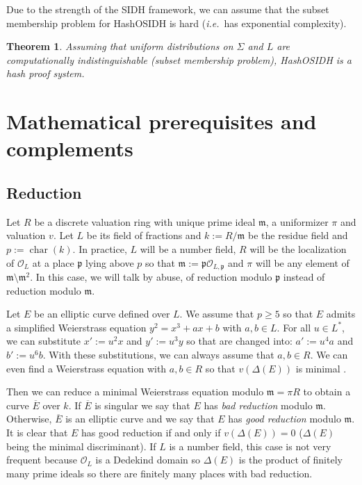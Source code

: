 \documentclass[a4paper,10pt]{report}
\theoremstyle{definition}
\theoremstyle{plain}
\newtheorem{theorem}[definition]{Theorem}
\theoremstyle{definition}
\newcommand{\ie}{\emph{i.e.}\ }
\newcommand{\mO}{\mathcal{O}}
\renewcommand{\(}{\left(}
\renewcommand{\)}{\right)}
\newcommand{\mf}[1]{\mathfrak{#1}}
\newcommand{\mfm}{\mathfrak{m}}
\newcommand{\mfp}{\mathfrak{p}}
\DeclareMathOperator{\Char}{char}%
\begin{document}
Due to the strength of the SIDH framework, we can assume that the subset membership problem for HashOSIDH is hard (\ie has exponential complexity).

\begin{theorem}
Assuming that uniform distributions on $\Sigma$ and $L$ are computationally indistinguishable (subset membership problem), HashOSIDH is a hash proof system.
\end{theorem}




\appendix

\chapter{Mathematical prerequisites and complements}

\section{Reduction}

Let $R$ be a discrete valuation ring with unique prime ideal $\mf{m}$,  a uniformizer $\pi$ and valuation $v$.  Let $L$ be its field of fractions and $k:=R/\mfm$ be the residue field and $p:=\Char(k)$.  In practice,  $L$ will be a number field, $R$ will be the localization of $\mO_L$ at a place $\mfp$ lying above $p$ so that $\mfm:=\mfp\mO_{L,\mfp}$ and $\pi$ will be any element of $\mfm\setminus\mfm^2$.  In this case, we will talk by abuse, of reduction modulo $\mfp$ instead of reduction modulo $\mfm$. 

Let $E$ be an elliptic curve defined over $L$.  We assume that $p\geq 5$ so that $E$ admits a simplified Weierstrass equation $y^2=x^3+ax+b$ with $a,b\in L$.  For all $u\in L^*$,  we can substitute $x':=u^2 x$ and $y':=u^3 y$ so that are changed into: $a':=u^4a$ and  $b':=u^6b$.  With these substitutions,  we can always assume that $a, b\in R$.  We can even find a Weierstrass equation with $a, b\in R$ so that $v(\Delta(E))$ is minimal \cite[proposition VII.1.3.(a)]{Silverman1}.  

Then we can reduce a minimal Weierstrass equation modulo $\mfm=\pi R$ to obtain a curve $\overline{E}$ over $k$.  If $\overline{E}$ is singular we say that $E$ has \emph{bad reduction} modulo $\mfm$.  Otherwise,  $\overline{E}$ is an elliptic curve and we say that $E$ has \emph{good reduction} modulo $\mfm$.  It is clear that $E$ has good reduction if and only if $v(\Delta(E))=0$ ($\Delta(E)$ being the minimal discriminant).  If $L$ is a number field,  this case is not very frequent because $\mO_L$ is a Dedekind domain so $\Delta(E)$ is the product of finitely many prime ideals so there are finitely many places with bad reduction.
\end{document}
